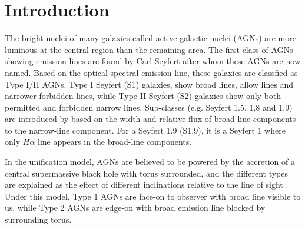 \documentclass[twocolumn]{aastex63}
\begin{document}
\section{Introduction}\label{sec:intro} 

The bright nuclei of many galaxies called active galactic nuclei (AGNs) are more luminous at the central region than the remaining area. The first class of AGNs showing emission lines are found by Carl Seyfert after whom these AGNs are now named. Based on the optical spectral emission line, these galaxies are classfied as Type I/II AGNs. Type I Seyfert (S1) galaxies, show broad lines, allow lines and narrower forbidden lines, while Type II Seyfert (S2) galaxies show only both permitted and forbidden narrow lines. Sub-classes (e.g. Seyfert 1.5, 1.8 and 1.9) are introduced by \citet{1976MNRAS.176P..61O,1981ApJ...249..462O} based on the width and relative flux of broad-line components to the narrow-line component. For a Seyfert 1.9 (S1.9), it is a Seyfert 1 where only $H\alpha$ line appears in the broad-line components. 

In the unification model, AGNs are believed to be powered by the accretion of a central supermassive black hole with torus surrounded, and the different types are explained as the effect of different inclinations relative to the line of sight \citep[see][]{1993ARA&A..31..473A}. Under this model, Type 1 AGNs are face-on to observer with broad line visible to us, while Type 2 AGNs are edge-on with broad emission line blocked by surrounding torus.

\end{document}
